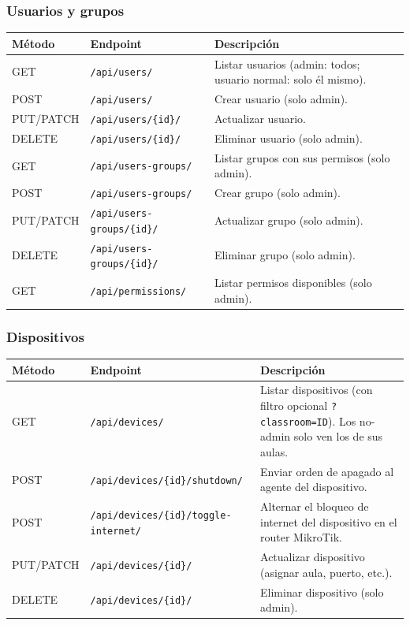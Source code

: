 \documentclass[12pt, a4paper, twoside]{article}
\begin{document}
\subsubsection{Usuarios y grupos}

\begin{longtable}{llp{6cm}}
  \toprule
  \textbf{Método} & \textbf{Endpoint} & \textbf{Descripción} \\
  \midrule
  GET & \texttt{/api/users/} & Listar usuarios (admin: todos; usuario normal: solo él mismo). \\
  POST & \texttt{/api/users/} & Crear usuario (solo admin). \\
  PUT/PATCH & \texttt{/api/users/\{id\}/} & Actualizar usuario. \\
  DELETE & \texttt{/api/users/\{id\}/} & Eliminar usuario (solo admin). \\
  GET & \texttt{/api/users-groups/} & Listar grupos con sus permisos (solo admin). \\
  POST & \texttt{/api/users-groups/} & Crear grupo (solo admin). \\
  PUT/PATCH & \texttt{/api/users-groups/\{id\}/} & Actualizar grupo (solo admin). \\
  DELETE & \texttt{/api/users-groups/\{id\}/} & Eliminar grupo (solo admin). \\
  GET & \texttt{/api/permissions/} & Listar permisos disponibles (solo admin). \\
  \bottomrule
\end{longtable}

\subsubsection{Dispositivos}

\begin{longtable}{llp{6cm}}
  \toprule
  \textbf{Método} & \textbf{Endpoint} & \textbf{Descripción} \\
  \midrule
  GET & \texttt{/api/devices/} & Listar dispositivos (con filtro opcional \texttt{?classroom=ID}). Los no-admin solo ven los de sus aulas. \\
  POST & \texttt{/api/devices/\{id\}/shutdown/} & Enviar orden de apagado al agente del dispositivo. \\
  POST & \texttt{/api/devices/\{id\}/toggle-internet/} & Alternar el bloqueo de internet del dispositivo en el router MikroTik. \\
  PUT/PATCH & \texttt{/api/devices/\{id\}/} & Actualizar dispositivo (asignar aula, puerto, etc.). \\
  DELETE & \texttt{/api/devices/\{id\}/} & Eliminar dispositivo (solo admin). \\
  \bottomrule
\end{longtable}
\end{document}

